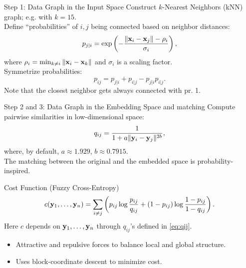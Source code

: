 \documentclass[11pt,handout,aspectratio=169]{beamer}
\begin{document}
\begin{frame}{Step 1: Data Graph in the Input Space}
Construct $k$-Nearest Neighbors (kNN) graph; e.g.  with $k=15$.\\[3mm]
Define ``probabilities'' of $i,j$ being connected based on neighbor distances:
    $$p_{j|i} = \exp\left(-\frac{\|\mathbf{x}_i - \mathbf{x}_j\| - \rho_i}{\sigma_i}\right),$$
    where $\rho_i=\min_{k\neq i}\|\mathbf{x}_i-\mathbf{x}_k\|$ and $\sigma_i$ is a scaling factor.\\[3mm]
Symmetrize probabilities:
    $$p_{ij} = p_{j|i} + p_{i|j} - p_{j|i}p_{i|j}.$$
    Note that the closest neighbor gets always connected with pr. 1.
\end{frame}

\begin{frame}{Step 2 and 3: Data Graph in the Embedding Space and matching}
Compute pairwise similarities in low-dimensional space:
\begin{equation}\label{eq:qij}
	q_{ij} = \frac{1}{1 + a\|\mathbf{y}_i - \mathbf{y}_j\|^{2b}},
\end{equation}
    where, by default,  $a \approx 1.929$, $b \approx 0.7915$.\\[4mm]
The matching between the original and the embedded space is probability-inspired.
\begin{alertblock}{Cost Function (Fuzzy Cross-Entropy)}
$$c(\mathbf{y}_1,\ldots,\mathbf{y}_n) = \sum_{i \neq j} \left(p_{ij} \log \frac{p_{ij}}{q_{ij}} + (1 - p_{ij}) \log \frac{1 - p_{ij}}{1 - q_{ij}}\right).$$
Here $c$ depends on $\mathbf{y}_1,\ldots,\mathbf{y}_n$ through $q_{ij}$'s defined in \eqref{eq:qij}.
\end{alertblock}
\begin{itemize}
\item Attractive and repulsive forces to balance local and global structure.
    \item Uses block-coordinate descent to minimize cost.
\end{itemize}
\end{frame}
\end{document}
